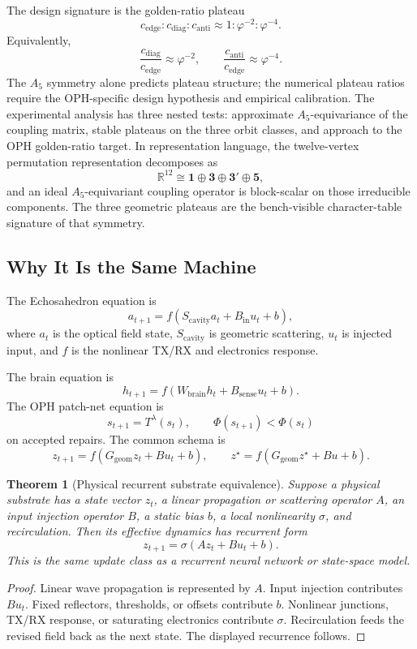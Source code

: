 \documentclass[11pt]{article}
\newtheorem{theorem}{Theorem}[section]
\theoremstyle{remark}
\theoremstyle{plain}
\newcommand{\R}{\mathbb R}
\newcommand{\diag}{\mathrm{diag}}
\newcommand{\anti}{\mathrm{anti}}
\begin{document}
The design signature is the golden-ratio plateau
\[
\boxed{
c_{\mathrm{edge}}:c_{\diag}:c_{\anti}
\approx
1:\varphi^{-2}:\varphi^{-4}.
}
\]
Equivalently,
\[
\frac{c_{\diag}}{c_{\mathrm{edge}}}\approx\varphi^{-2},
\qquad
\frac{c_{\anti}}{c_{\mathrm{edge}}}\approx\varphi^{-4}.
\]
The \(A_5\) symmetry alone predicts plateau structure; the numerical plateau ratios require the OPH-specific design hypothesis and empirical calibration. The experimental analysis has three nested tests: approximate \(A_5\)-equivariance of the coupling matrix, stable plateaus on the three orbit classes, and approach to the OPH golden-ratio target. In representation language, the twelve-vertex permutation representation decomposes as
\[
\R^{12}\cong \mathbf 1\oplus \mathbf 3\oplus \mathbf 3'\oplus \mathbf 5,
\]
and an ideal \(A_5\)-equivariant coupling operator is block-scalar on those irreducible components. The three geometric plateaus are the bench-visible character-table signature of that symmetry.

\subsection{Why It Is the Same Machine}

The Echosahedron equation is
\[
a_{t+1}
=
f(S_{\mathrm{cavity}}a_t+B_{\mathrm{in}}u_t+b),
\]
where \(a_t\) is the optical field state, \(S_{\mathrm{cavity}}\) is geometric scattering, \(u_t\) is injected input, and \(f\) is the nonlinear TX/RX and electronics response.

The brain equation is
\[
h_{t+1}
=
f(W_{\mathrm{brain}}h_t+B_{\mathrm{sense}}u_t+b).
\]
The OPH patch-net equation is
\[
s_{t+1}=T^\lambda(s_t),
\qquad
\Phi(s_{t+1})<\Phi(s_t)
\]
on accepted repairs. The common schema is
\[
\boxed{
z_{t+1}=f(G_{\mathrm{geom}}z_t+Bu_t+b),
\qquad
z^\star=f(G_{\mathrm{geom}}z^\star+Bu+b).
}
\]

\begin{theorem}[Physical recurrent substrate equivalence]
Suppose a physical substrate has a state vector \(z_t\), a linear propagation or scattering operator \(A\), an input injection operator \(B\), a static bias \(b\), a local nonlinearity \(\sigma\), and recirculation. Then its effective dynamics has recurrent form
\[
z_{t+1}=\sigma(Az_t+Bu_t+b).
\]
This is the same update class as a recurrent neural network or state-space model.
\end{theorem}

\begin{proof}
Linear wave propagation is represented by \(A\). Input injection contributes \(Bu_t\). Fixed reflectors, thresholds, or offsets contribute \(b\). Nonlinear junctions, TX/RX response, or saturating electronics contribute \(\sigma\). Recirculation feeds the revised field back as the next state. The displayed recurrence follows.
\end{proof}
\end{document}

